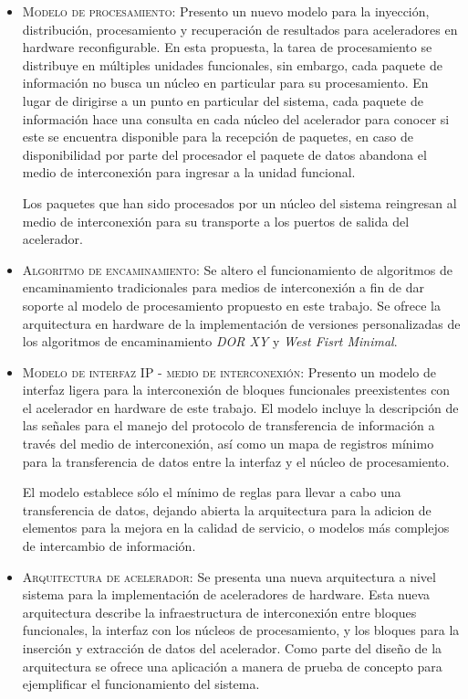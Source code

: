 	\begin{itemize}

			\item 	\textsc{Modelo de procesamiento}: Presento un nuevo modelo para la inyección, distribución, procesamiento y recuperación de resultados para aceleradores en hardware reconfigurable. En esta propuesta, la tarea de procesamiento se distribuye en múltiples unidades funcionales, sin embargo, cada paquete de información no busca un núcleo en particular para su procesamiento. En lugar de dirigirse a un punto en particular del sistema, cada paquete de información hace una consulta en cada núcleo del acelerador para conocer si este se encuentra disponible para la recepción de paquetes, en caso de disponibilidad por parte del procesador el paquete de datos abandona el medio de interconexión para ingresar a la unidad funcional.

			Los paquetes que han sido procesados por un núcleo del sistema reingresan al medio de interconexión para su transporte a los puertos de salida del acelerador.

			\item 	\textsc{Algoritmo de encaminamiento}: Se altero el funcionamiento de algoritmos de encaminamiento tradicionales para medios de interconexión a fin de dar soporte al modelo de procesamiento propuesto en este trabajo. Se ofrece la arquitectura en hardware de la implementación de versiones personalizadas de los algoritmos de encaminamiento \textit{DOR XY} y \textit{West Fisrt Minimal}. 

			\item 	\textsc{Modelo de interfaz IP - medio de interconexión}: Presento un modelo de interfaz ligera para la interconexión de bloques funcionales preexistentes con el acelerador en hardware de este trabajo. El modelo incluye la descripción de las señales para el manejo del protocolo de transferencia de información a través del medio de interconexión, así como un mapa de registros mínimo para la transferencia de datos entre la interfaz y el núcleo de procesamiento.

			El modelo establece sólo el mínimo de reglas para llevar a cabo una transferencia de datos, dejando abierta la arquitectura para la adicion de elementos para la mejora en la calidad de servicio, o modelos más complejos de intercambio de información.

			\item 	\textsc{Arquitectura de acelerador}: Se presenta una nueva arquitectura a nivel sistema para la implementación de aceleradores de hardware. Esta nueva arquitectura describe la infraestructura de interconexión entre bloques funcionales, la interfaz con los núcleos de procesamiento, y los bloques para la inserción y extracción de datos del acelerador. Como parte del diseño de la arquitectura se ofrece una aplicación a manera de prueba de concepto para ejemplificar el funcionamiento del sistema.


\end{itemize}
